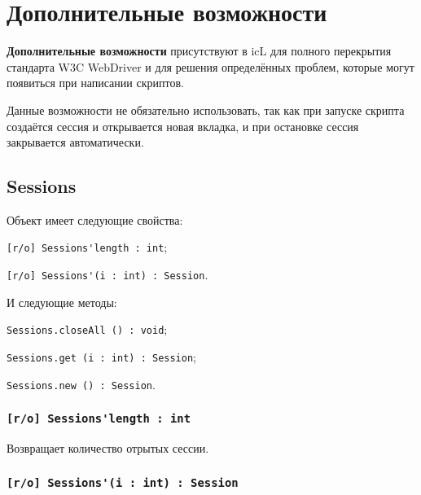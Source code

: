 

\section{Дополнительные возможности}

{\bf Дополнительные возможности} присутствуют в icL для полного перекрытия стандарта W3C WebDriver и для решения определённых проблем, которые могут появиться при написании скриптов.

Данные возможности не обязательно использовать, так как при запуске скрипта создаётся сессия и открывается новая вкладка, и при остановке сессия закрывается автоматически.


\subsection{{\color{orange} Sessions}}

Объект \sessions{} имеет следующие свойства:
\begin{icItems}
	\item \lstinline|[r/o] Sessions'length : int|;
	\item \lstinline|[r/o] Sessions'(i : int) : Session|.
\end{icItems}

И следующие методы:
\begin{icItems}
	\item \lstinline|Sessions.closeAll () : void|;
	\item \lstinline|Sessions.get (i : int) : Session|;
	\item \lstinline|Sessions.new () : Session|.
\end{icItems}

\subsubsection{\lstinline|[r/o] Sessions'length : int|}

Возвращает количество отрытых сессии.

\subsubsection{\lstinline|[r/o] Sessions'(i : int) : Session|}

